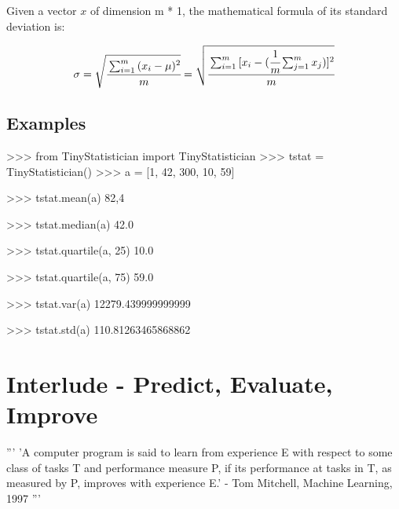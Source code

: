 \documentclass[]{article}
\newenvironment{Shaded}{\begin{snugshade}}{\end{snugshade}}
\newcommand{\CommentTok}[1]{\textcolor[rgb]{0.48,0.49,0.49}{#1}}
\newcommand{\DecValTok}[1]{\textcolor[rgb]{0.96,0.45,0.00}{#1}}
\newcommand{\FloatTok}[1]{\textcolor[rgb]{0.96,0.45,0.00}{#1}}
\newcommand{\ImportTok}[1]{\textcolor[rgb]{0.15,0.68,0.38}{#1}}
\newcommand{\NormalTok}[1]{\textcolor[rgb]{0.81,0.81,0.76}{#1}}
\newcommand{\OperatorTok}[1]{\textcolor[rgb]{0.81,0.81,0.76}{#1}}
\begin{document}
Given a vector \(x\) of dimension m * 1, the mathematical formula of its
standard deviation is:

\large

\[
\sigma = \sqrt{\cfrac{\sum_{i = 1}^{m}{(x_i - \mu)^2}}{m}} = \sqrt{\cfrac{\sum_{i = 1}^{m}{[x_i - (\cfrac{1}{m}\sum_{j = 1}^{m}{x_j}})]^2}{m}}
\] \normalsize

\hypertarget{examples}{%
\subsection{Examples}\label{examples}}

\begin{Shaded}
\begin{Highlighting}[]
\OperatorTok{>>>} \ImportTok{from}\NormalTok{ TinyStatistician }\ImportTok{import}\NormalTok{ TinyStatistician}
\OperatorTok{>>>}\NormalTok{ tstat }\OperatorTok{=}\NormalTok{ TinyStatistician()}
\OperatorTok{>>>}\NormalTok{ a }\OperatorTok{=}\NormalTok{ [}\DecValTok{1}\NormalTok{, }\DecValTok{42}\NormalTok{, }\DecValTok{300}\NormalTok{, }\DecValTok{10}\NormalTok{, }\DecValTok{59}\NormalTok{]}

\OperatorTok{>>>}\NormalTok{ tstat.mean(a)}
\DecValTok{82}\NormalTok{,}\DecValTok{4}

\OperatorTok{>>>}\NormalTok{ tstat.median(a)}
\FloatTok{42.0}

\OperatorTok{>>>}\NormalTok{ tstat.quartile(a, }\DecValTok{25}\NormalTok{)}
\FloatTok{10.0}

\OperatorTok{>>>}\NormalTok{ tstat.quartile(a, }\DecValTok{75}\NormalTok{)}
\FloatTok{59.0}

\OperatorTok{>>>}\NormalTok{ tstat.var(a)}
\FloatTok{12279.439999999999}

\OperatorTok{>>>}\NormalTok{ tstat.std(a)}
\FloatTok{110.81263465868862}
\end{Highlighting}
\end{Shaded}

\clearpage

\hypertarget{interlude---predict-evaluate-improve-1}{%
\section{Interlude - Predict, Evaluate,
Improve}\label{interlude---predict-evaluate-improve-1}}

\begin{Shaded}
\begin{Highlighting}[]
\CommentTok{'''}
\CommentTok{'A computer program is said to learn from experience E with respect to some class of tasks T and performance measure P, if its performance at tasks in T, as measured by P, improves with experience E.' }
\CommentTok{                            - Tom Mitchell, Machine Learning, 1997}
\CommentTok{'''}
\end{Highlighting}
\end{Shaded}
\end{document}
